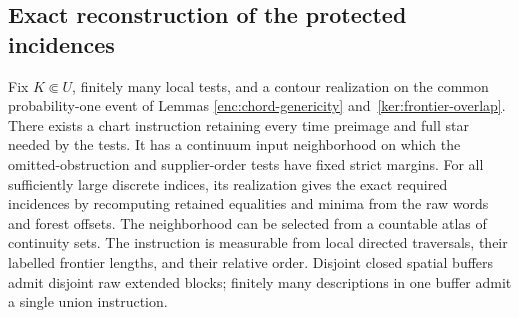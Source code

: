 \subsection{Exact reconstruction of the protected incidences}

\begin{lemma}\label{ker:incidences}
Fix \(K\Subset U\), finitely many local tests, and a contour realization
on the common probability-one event of Lemmas
\ref{enc:chord-genericity} and~\ref{ker:frontier-overlap}.
There exists a chart instruction retaining every time preimage and
full star needed by the tests.  It has a continuum input neighborhood
on which the omitted-obstruction and supplier-order tests have fixed
strict margins.  For all sufficiently large discrete indices, its
realization gives the exact required incidences by recomputing
retained equalities and minima from the raw words and forest offsets.
The neighborhood can be selected from a countable atlas of continuity
sets.  The instruction is measurable from local directed traversals,
their labelled frontier lengths, and their relative order.
Disjoint closed spatial buffers admit disjoint raw extended blocks;
finitely many descriptions in one buffer admit a single union instruction.
\end{lemma}


